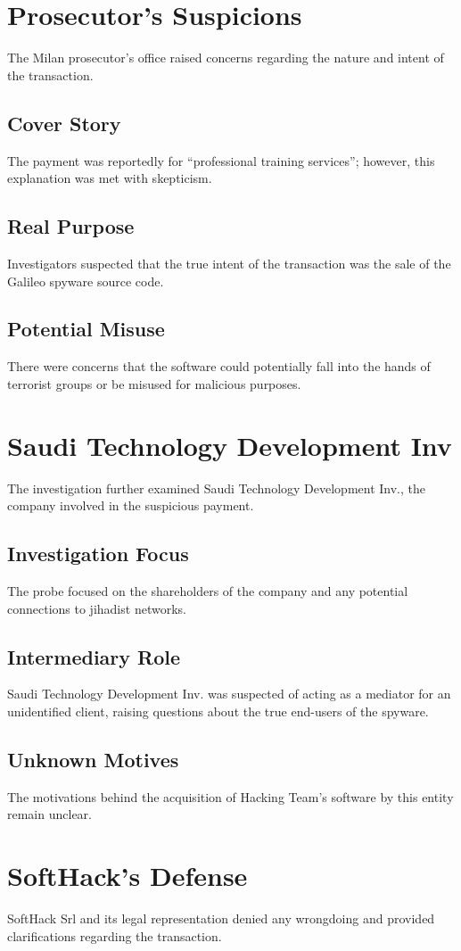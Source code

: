 \section{Prosecutor's Suspicions}
The Milan prosecutor’s office raised concerns regarding the nature and intent of the transaction.
\subsection{Cover Story}
The payment was reportedly for “professional training services”; however, this explanation was met with skepticism.
\subsection{Real Purpose}
Investigators suspected that the true intent of the transaction was the sale of the Galileo spyware source code.
\subsection{Potential Misuse}
There were concerns that the software could potentially fall into the hands of terrorist groups or be misused for malicious purposes.

\section{Saudi Technology Development Inv}
The investigation further examined Saudi Technology Development Inv., the company involved in the suspicious payment.
\subsection{Investigation Focus}
The probe focused on the shareholders of the company and any potential connections to jihadist networks.
\subsection{Intermediary Role}
Saudi Technology Development Inv. was suspected of acting as a mediator for an unidentified client, raising questions about the true end-users of the spyware.
\subsection{Unknown Motives}
The motivations behind the acquisition of Hacking Team's software by this entity remain unclear.

\section{SoftHack's Defense}
SoftHack Srl and its legal representation denied any wrongdoing and provided clarifications regarding the transaction.

